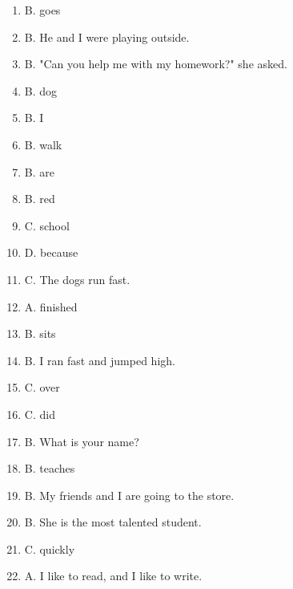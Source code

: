 \documentclass[12pt]{article}
\begin{document}
\begin{enumerate}

    \item B. goes
    \item B. He and I were playing outside.
    \item B. "Can you help me with my homework?" she asked.
    \item B. dog
    \item B. I
    \item B. walk
    \item B. are
    \item B. red
    \item C. school
    \item D. because
    \item C. The dogs run fast.
    \item A. finished
    \item B. sits
    \item B. I ran fast and jumped high.
    \item C. over
    \item C. did
    \item B. What is your name?
    \item B. teaches
    \item B. My friends and I are going to the store.
    \item B. She is the most talented student.
    \item C. quickly
    \item A. I like to read, and I like to write.

\end{enumerate}
\end{document}
